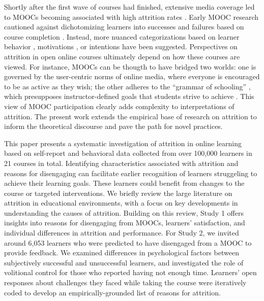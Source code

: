 \documentclass{sigchi}\usepackage[]{graphicx}\usepackage[]{color}
\begin{document}
Shortly after the first wave of courses had finished, extensive media coverage led to MOOCs becoming associated with high attrition rates \cite{lewin2013after,parr2013mooc}. Early MOOC research cautioned against dichotomizing learners into successes and failures based on course completion \cite{kizilcec2013deconstructing,rivard2013measuring}. Instead, more nuanced categorizations based on learner behavior \cite{kizilcec2013deconstructing,clow2013moocs}, motivations \cite{kizilcec2015motivation}, or intentions \cite{wilkowski2014student} have been suggested. Perspectives on attrition in open online courses ultimately depend on how these courses are viewed. For instance, MOOCs can be thougth to have bridged two worlds: one is governed by the user-centric norms of online media, where everyone is encouraged to be as active as they wish; the other adheres to the ``grammar of schooling'' \cite{tyack1994grammar}, which presupposes instructor-defined goals that students strive to achieve \cite{kizilcec2015motivation}. This view of MOOC participation clearly adds complexity to interpretations of attrition. The present work extends the empirical base of research on attrition to inform the theoretical discourse and pave the path for novel practices.

This paper presents a systematic investigation of attrition in online learning based on self-report and behavioral data collected from over 100,000 learners in 21 courses in total. Identifying characteristics associated with attrition and reasons for disengaging can facilitate earlier recognition of learners struggeling to achieve their learning goals. These learners could benefit from changes to the course or targeted interventions. We briefly review the large literature on attrition in educational environments, with a focus on key developments in understanding the causes of attrition. Building on this review, Study 1 offers insights into reasons for disengaging from MOOCs, learners' satisfaction, and individual differences in attrition and performance. For Study 2, we invited around 6,053 learners who were predicted to have disengaged from a MOOC to provide feedback. We examined differences in psychological factors between subjectively successful and unsuccessful learners, and investigated the role of volitional control for those who reported having not enough time. Learners' open responses about challenges they faced while taking the course were iteratively coded to develop an empirically-grounded list of reasons for attrition.
\end{document}
